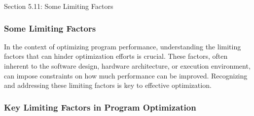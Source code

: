 \begin{notes}{Section 5.11: Some Limiting Factors}
    \subsubsection*{Some Limiting Factors}

    In the context of optimizing program performance, understanding the limiting factors that can hinder optimization efforts is crucial. These factors, often inherent to the software design, hardware 
    architecture, or execution environment, can impose constraints on how much performance can be improved. Recognizing and addressing these limiting factors is key to effective optimization. \vspace*{1em}
    
    \subsubsection*{Key Limiting Factors in Program Optimization}
    

\end{notes}
